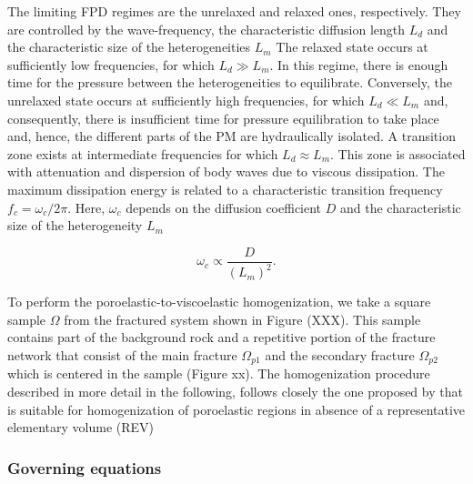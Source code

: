 \documentclass[draft]{agujournal2019}
\begin{document}
The limiting FPD regimes are the unrelaxed and relaxed ones, respectively. They are controlled by the wave-frequency, the characteristic diffusion length $L_d$ and the characteristic size of the heterogeneities $L_m$ 
The relaxed state occurs at sufficiently low frequencies, for which  $L_d \gg L_m$. In this regime, there is enough time for the pressure between the heterogeneities  to equilibrate. Conversely, the unrelaxed state occurs at sufficiently high frequencies, for which $L_d \ll L_m$ and, consequently, there is insufficient time for pressure equilibration to take place and, hence, the different parts of the PM are hydraulically isolated. A transition zone exists at intermediate frequencies for which $L_d \approx L_m$.
This zone is associated with attenuation and dispersion of body waves due to viscous dissipation. The maximum dissipation energy is related to a characteristic transition frequency $f_c= \omega_c/2\pi$. Here, $\omega_c$ depends on the diffusion coefficient $D$ and the characteristic size of the heterogeneity $L_m$ \cite{White1975a,Muller2010}
\begin{linenomath*}
\begin{equation}\label{Eq.4}
\omega_c \propto \frac{D}{(L_m)^2}.
\end{equation}
\end{linenomath*}
To perform the poroelastic-to-viscoelastic homogenization, we take a square sample $\Omega$ from the fractured system shown in Figure (XXX). This sample contains part of the background rock and a repetitive portion of the fracture network that consist of the main fracture $\Omega_{p1}$ and the secondary fracture $\Omega_{p2}$ which is centered in the sample (Figure xx). The homogenization procedure described in more detail in the following, follows closely the one proposed by  that is suitable for homogenization of poroelastic regions in absence of a representative elementary volume (REV)

\subsubsection{Governing equations}
\end{document}
